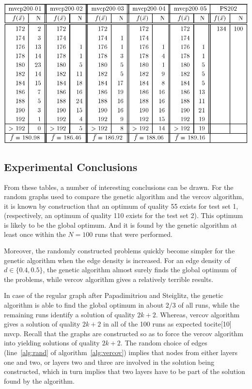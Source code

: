 \documentclass[12pt]{article}
\begin{document}
\begin{table}[!htbp]
\centering
\includegraphics[width=1\textwidth]{t4}
\caption{%
Experimental results obtained by the vercov algorithm for five random graphs of size $n = 200$ with edge density: $d = 0.1$ (``mvcp200-01''), $d = 0.2$ (``mvcp200-02''), $d = 0.3$ (``mvcp200-03''), $d = 0.5$ (``mvcp200-04''), $d = 0.5$ (``mvcp200-05'') and the regular graph of size $n = 202 \ (k=66)$ from Papadimitriou and Steiglitz (``PS202'').%
}
\label{tbl:t4}
\end{table}


\subsection{Experimental Conclusions}
From these tables, a number of interesting conclusions
can be drawn.
For the random graphs used to compare the
genetic algorithm and the vercov algorithm,
it is known by construction that an optimum of
quality 55 exists for test set 1,
(respectively, an optimum of quality 110 exists
for the test set 2).
This optimum is likely to be the global optimum.
And it is found by the genetic algorithm at least once
within the $N = 100$ runs that were performed.

Moreover, the randomly constructed problems quickly
become simpler for the genetic algorithm when the edge
density is increased.
For an edge density of $d \in \{0.4, 0.5\}$, the
genetic algorithm almost surely finds the global optimum
of the problems, while vercov algorithm gives
a relatively terrible results.

In case of the regular graph after Papadimitriou and
Steiglitz, the genetic algorithm is able to find the global
optimum in about $2/3$ of all runs, while the remaining
runs identify a solution of quality $2k + 2$.
Whereas, vercov algorithm gives a solution of
quality $2k + 2$ in all of the 100 runs as expected tocite{[10] mvcp}.
Recall that the graphs are constructed
so as to force the vercov algorithm into yielding solutions
of quality $2k + 2$.
The random choice of edges (line~\ref{alg:rand} of algorithm~\ref{alg:vercov})
implies that nodes from either layers one and two, or layers two and three
are involved in the solution being constructed,
which in turn implies that two layers have to be part of the solution
found by the algorithm.
\end{document}
